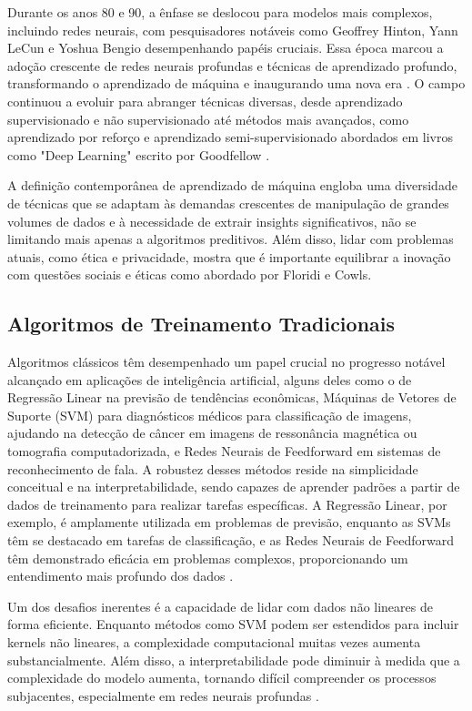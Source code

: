 Durante os anos 80 e 90, a ênfase se deslocou para modelos mais complexos, incluindo redes neurais, com pesquisadores notáveis como Geoffrey Hinton, Yann LeCun e Yoshua Bengio desempenhando papéis cruciais. Essa época marcou a adoção crescente de redes neurais profundas e técnicas de aprendizado profundo, transformando o aprendizado de máquina e inaugurando uma nova era \cite{hinton2012deep}. O campo continuou a evoluir para abranger técnicas diversas, desde aprendizado supervisionado e não supervisionado até métodos mais avançados, como aprendizado por reforço e aprendizado semi-supervisionado abordados em livros como "Deep Learning" escrito por Goodfellow \cite{goodfellow2016deep}.

A definição contemporânea de aprendizado de máquina engloba uma diversidade de técnicas que se adaptam às demandas crescentes de manipulação de grandes volumes de dados e à necessidade de extrair insights significativos, não se limitando mais apenas a algoritmos preditivos. Além disso, lidar com problemas atuais, como ética e privacidade, mostra que é importante equilibrar a inovação com questões sociais e éticas como abordado por Floridi e Cowls\cite{floridi2018ai}.

\subsection{Algoritmos de Treinamento Tradicionais}

Algoritmos clássicos têm desempenhado um papel crucial no progresso notável alcançado em aplicações de inteligência artificial, alguns deles como o de Regressão Linear na previsão de tendências econômicas, Máquinas de Vetores de Suporte (SVM) para diagnósticos médicos para classificação de imagens, ajudando na detecção de câncer em imagens de ressonância magnética ou tomografia computadorizada, e Redes Neurais de Feedforward em sistemas de reconhecimento de fala. A robustez desses métodos reside na simplicidade conceitual e na interpretabilidade, sendo capazes de aprender padrões a partir de dados de treinamento para realizar tarefas específicas. A Regressão Linear, por exemplo, é amplamente utilizada em problemas de previsão, enquanto as SVMs têm se destacado em tarefas de classificação, e as Redes Neurais de Feedforward têm demonstrado eficácia em problemas complexos, proporcionando um entendimento mais profundo dos dados \cite{bishop2006pattern} \cite{russell2016artificial}.

Um dos desafios inerentes é a capacidade de lidar com dados não lineares de forma eficiente. Enquanto métodos como SVM podem ser estendidos para incluir kernels não lineares, a complexidade computacional muitas vezes aumenta substancialmente. Além disso, a interpretabilidade pode diminuir à medida que a complexidade do modelo aumenta, tornando difícil compreender os processos subjacentes, especialmente em redes neurais profundas \cite{goh2017deep}.

